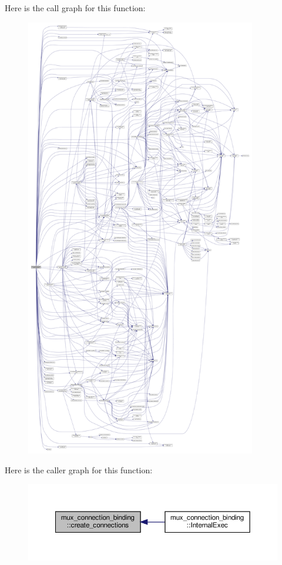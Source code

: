 Here is the call graph for this function\+:
\nopagebreak
\begin{figure}[H]
\begin{center}
\leavevmode
\includegraphics[height=550pt]{d7/d1e/classmux__connection__binding_a7c22a4143586f31111cd64e34f1c9a59_cgraph}
\end{center}
\end{figure}
Here is the caller graph for this function\+:
\nopagebreak
\begin{figure}[H]
\begin{center}
\leavevmode
\includegraphics[width=350pt]{d7/d1e/classmux__connection__binding_a7c22a4143586f31111cd64e34f1c9a59_icgraph}
\end{center}
\end{figure}
\mbox{\label{classmux__connection__binding_ae17b2f5ce5c792eabdf7d5343e866b05}} 
